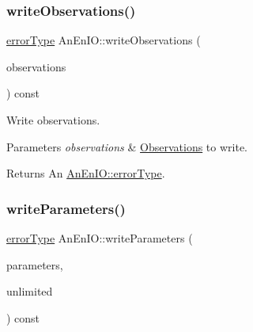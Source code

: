\subsubsection{\texorpdfstring{write\+Observations()}{writeObservations()}}
{\footnotesize\ttfamily \mbox{\hyperlink{class_an_en_i_o_aa56bc1ec6610b86db4349bce20f9ead0}{error\+Type}} An\+En\+I\+O\+::write\+Observations (\begin{DoxyParamCaption}\item[{const \mbox{\hyperlink{class_observations}{Observations}} \&}]{observations }\end{DoxyParamCaption}) const}

Write observations. 
\begin{DoxyParams}{Parameters}
{\em observations} & \mbox{\hyperlink{class_observations}{Observations}} to write. \\
\hline
\end{DoxyParams}
\begin{DoxyReturn}{Returns}
An \mbox{\hyperlink{class_an_en_i_o_aa56bc1ec6610b86db4349bce20f9ead0}{An\+En\+I\+O\+::error\+Type}}. 
\end{DoxyReturn}
\mbox{\label{class_an_en_i_o_a9ae88d089b2de16571085cb6f7f4cefb}} 
\subsubsection{\texorpdfstring{write\+Parameters()}{writeParameters()}}
{\footnotesize\ttfamily \mbox{\hyperlink{class_an_en_i_o_aa56bc1ec6610b86db4349bce20f9ead0}{error\+Type}} An\+En\+I\+O\+::write\+Parameters (\begin{DoxyParamCaption}\item[{const \mbox{\hyperlink{classanen_par_1_1_parameters}{anen\+Par\+::\+Parameters}} \&}]{parameters,  }\item[{bool}]{unlimited }\end{DoxyParamCaption}) const}

